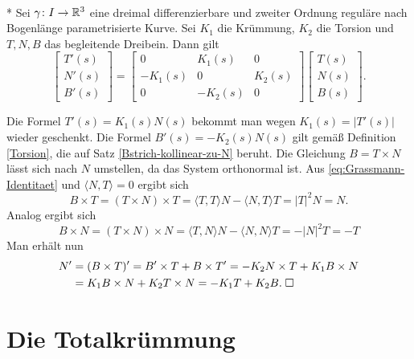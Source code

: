 \begin{theorem}\mbox{}\\*
Sei $\gamma\colon I\to\mathbb R^3$ eine dreimal differenzierbare und zweiter
Ordnung reguläre nach Bogenlänge parametrisierte Kurve.
Sei $K_1$ die Krümmung, $K_2$ die Torsion und $T,N,B$ das begleitende
Dreibein. Dann gilt%
\begin{equation}
\begin{bmatrix}
T'(s)\\ N'(s)\\ B'(s)
\end{bmatrix}
= \begin{bmatrix}
0 & K_1(s) & 0\\
-K_1(s) & 0 & K_2(s)\\
0 & -K_2(s) & 0
\end{bmatrix}
\begin{bmatrix}
T(s)\\ N(s)\\ B(s)
\end{bmatrix}.
\end{equation}
\end{theorem}

\noindent{}
Die Formel $T'(s)=K_1(s)N(s)$ bekommt man wegen $K_1(s)=|T'(s)|$
wieder geschenkt. Die Formel $B'(s)=-K_2(s)N(s)$ gilt gemäß
Definition \ref{Torsion}, die auf Satz \ref{Bstrich-kollinear-zu-N}
beruht. Die Gleichung $B=T\times N$ lässt sich nach $N$ umstellen,
da das System orthonormal ist. Aus \eqref{eq:Grassmann-Identitaet}
und $\langle N,T\rangle=0$ ergibt sich
\begin{equation}
B\times T = (T\times N)\times T
= \langle T,T\rangle N - \langle N,T\rangle T
= |T|^2 N = N.
\end{equation}
Analog ergibt sich
\begin{equation}
B\times N = (T\times N)\times N
= \langle T,N\rangle N - \langle N,N\rangle T
= -|N|^2 T = -T
\end{equation}
Man erhält nun
\begin{align}
N' &= (B\times T)' = B'\times T+B\times T'
= -K_2 N\times T+K_1 B\times N\\
&= K_1 B\times N+K_2 T\times N
= -K_1 T + K_2 B.\;\Box
\end{align}

\section{Die Totalkrümmung}

